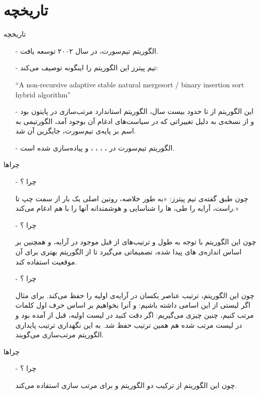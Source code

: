 \section{تاریخچه}
\begin{frame}{تاریخچه}
\begin{itemize}\itemr
\item[-]
الگوریتم تیم‌سورت، در سال ۲۰۰۲ توسعه یافت.

\item[-]
تیم‌ پیترز این الگوریتم را اینگونه توصیف می‌کند:
\begin{flushleft}
\begin{latin}
``A non-recursive adaptive stable natural mergesort / binary insertion sort hybrid algorithm''
\end{latin}
\end{flushleft}

\item[-]
این الگوریتم از 
تا حدود بیست سال، الگوریتم استاندارد مرتب‌سازی در پایتون بود و از نسخه‌ی  
به دلیل تغییراتی که در سیاست‌های ادغام آن بوجود آمد، الگورتیمی به اسم 
بر پایه‌ی تیم‌سورت، جایگزین آن شد.

\item[-]
الگوریتم تیم‌سورت در 
،
،
،
،
 و 
پیاده‌سازی شده است.
\end{itemize}
\end{frame}

\begin{frame}{چراها}
\begin{itemize}\itemr
\item[-]
چرا ؟

چون طبق گفته‌ی تیم پیترز: «به طور خلاصه، روتین اصلی یک بار از سمت چپ تا راست، آرایه را طی، ‌ها را شناسایی و هوشمندانه‌ آنها را با هم ادغام می‌کند.»

\item[-]
چرا ؟

چون این الگوریتم با توجه به طول و ترتیب‌های از قبل موجود در آرایه، و همچنین بر اساس اندازه‌‌ی 
های
پیدا شده، تصمیماتی می‌گیرد تا از الگوریتم بهتری برای آن موقعیت استفاده کند.

\item[-]
چرا ؟

چون این الگوریتم، ترتیب عناصر یکسان در آرایه‌ی اولیه را حفظ می‌کند. برای مثال اگر لیستی از این اسامی داشته باشیم: 
و آنرا بخواهیم بر اساس حرف اول کلمات مرتب کنیم، چنین چیزی می‌گیریم:
اگر دقت کنید در لیست اولیه،  قبل از  آمده بود و در لیست مرتب شده هم همین ترتیب حفظ شد. به این نگهداری ترتیب پایداری الگوریتم مرتب‌سازی می‌گویند.
\end{itemize}
\end{frame}

\begin{frame}{چراها}
\begin{itemize}\itemr
\item[-]
چرا ؟

چون این الگوریتم از ترکیب دو الگوریتم 
و
برای مرتب سازی استفاده می‌کند.
\end{itemize}
\end{frame}